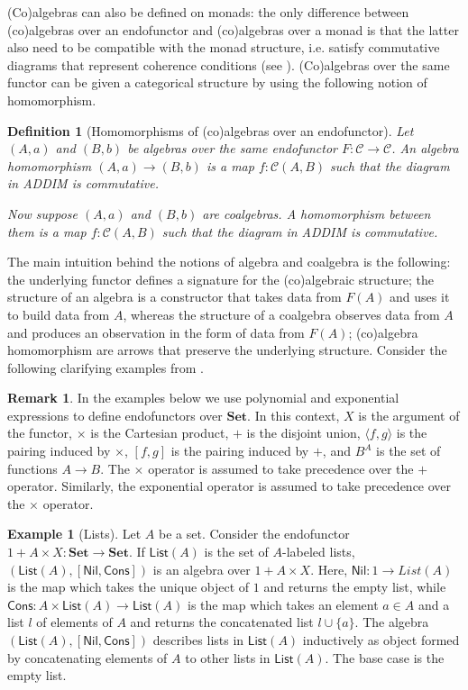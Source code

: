 \documentclass[11pt,a4paper,openright,twoside]{report}
\theoremstyle{plain}
\newtheorem{definition}[proposition]{Definition}
\theoremstyle{definition}
\newtheorem{remark}[proposition]{Remark}
\newtheorem{example}[proposition]{Example}
\begin{document}
(Co)algebras can also be defined on monads: the only difference between (co)algebras over an endofunctor and (co)algebras over a monad is that the latter also need to be compatible with the monad structure, i.e. satisfy commutative diagrams that represent coherence conditions (see \cite{gavranovicposition}). (Co)algebras over the same functor can be given a categorical structure by using the following notion of homomorphism.

\begin{definition}[Homomorphisms of (co)algebras over an endofunctor]
  Let $(A,a)$ and $(B,b)$ be algebras over the same endofunctor $F: \mathcal{C} \to \mathcal{C}$. An algebra homomorphism $(A,a)\to (B,b)$ is a map $f: \mathcal{C}(A,B)$ such that the diagram in ADDIM is commutative.


  Now suppose $(A,a)$ and $(B,b)$ are coalgebras. A homomorphism between them is a map $f: \mathcal{C}(A,B)$ such that the diagram in ADDIM is commutative.
\end{definition}

The main intuition behind the notions of algebra and coalgebra is the following: the underlying functor defines a signature for the (co)algebraic structure; the structure of an algebra is a constructor that takes data from $F(A)$ and uses it to build data from $A$, whereas the structure of a coalgebra observes data from $A$ and produces an observation in the form of data from $F(A)$; (co)algebra homomorphism are arrows that preserve the underlying structure. Consider the following clarifying examples from \cite{gavranovicposition}.

\begin{remark}
  In the examples below we use polynomial and exponential expressions to define endofunctors over $\mathbf{Set}$. In this context, $X$ is the argument of the functor, $\times$ is the Cartesian product, $+$ is the disjoint union, $\langle f,g \rangle$ is the pairing induced by $\times$, $[f,g]$ is the pairing induced by $+$, and $B^A$ is the set of functions $A \to B$. The $\times$ operator is assumed to take precedence over the $+$ operator. Similarly, the exponential operator is assumed to take precedence over the $\times$ operator. 
\end{remark}


\begin{example}[Lists]
  \label{ex: lists}
  Let $A$ be a set. Consider the endofunctor $1 + A \times X: \mathbf{Set} \to \mathbf{Set}$. If $\mathsf{List}(A)$ is the set of $A$-labeled lists, $(\mathsf{List}(A), [\mathsf{Nil}, \mathsf{Cons}])$ is an algebra over $1 + A \times X$. Here, $\mathsf{Nil}: 1 \to {List}(A)$ is the map which takes the unique object of $1$ and returns the empty list, while $\mathsf{Cons}: A \times \mathsf{List}(A) \to \mathsf{List}(A)$ is the map which takes an element $a \in A$ and a list $l$ of elements of $A$ and returns the concatenated list $l \cup \{a\}$. The algebra $(\mathsf{List}(A), [\mathsf{Nil}, \mathsf{Cons}])$ describes lists in $\mathsf{List}(A)$ inductively as object formed by concatenating elements of $A$ to other lists in $\mathsf{List}(A)$. The base case is the empty list.
\end{example}
\end{document}
